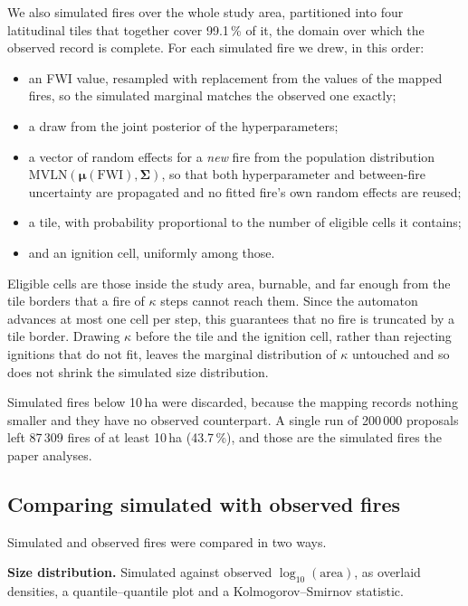 \documentclass[11pt,a4paper]{article}
\begin{document}
We also simulated fires over the whole study area, partitioned into four latitudinal tiles
that together cover 99.1\,\% of it, the domain over which the observed record is complete.
For each simulated fire we drew, in this order:

\begin{itemize}
\item an FWI value, resampled with replacement from the values of the mapped fires, so the
simulated marginal matches the observed one exactly;

\item a draw from the joint posterior of the hyperparameters;

\item a vector of random effects for a \emph{new} fire from the population distribution
$\text{MVLN}(\boldsymbol{\mu}(\mathrm{FWI}), \boldsymbol{\Sigma})$, so that both
hyperparameter and between-fire uncertainty are propagated and no fitted fire's own random
effects are reused;

\item a tile, with probability proportional to the number of eligible cells it contains;

\item and an ignition cell, uniformly among those.
\end{itemize}

Eligible cells are those inside the study area, burnable, and far enough from the tile
borders that a fire of $\kappa$ steps cannot reach them. Since the automaton advances at
most one cell per step, this guarantees that no fire is truncated by a tile border. Drawing
$\kappa$ before the tile and the ignition cell, rather than rejecting ignitions that do not
fit, leaves the marginal distribution of $\kappa$ untouched and so does not shrink the
simulated size distribution.

Simulated fires below 10\,ha were discarded, because the mapping records nothing smaller
and they have no observed counterpart. A single run of 200\,000 proposals left 87\,309 fires
of at least 10\,ha (43.7\,\%), and those are the simulated fires the paper analyses.

\subsection{Comparing simulated with observed fires}

Simulated and observed fires were compared in two ways.

\textbf{Size distribution.} Simulated against observed $\log_{10}(\mathrm{area})$, as
overlaid densities, a quantile--quantile plot and a Kolmogorov--Smirnov statistic.
\end{document}
